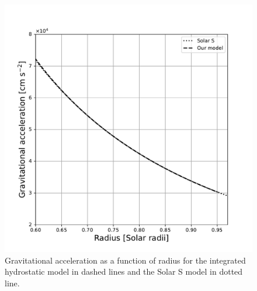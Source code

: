 \begin{figure}[htbp]
    \centering
    \includegraphics[width=0.8\linewidth]{./solar_vs_model_plots/Gravitational_acceleration.pdf} %
    \caption{Gravitational acceleration as a function of radius for the integrated hydrostatic model in dashed lines and the Solar S model in dotted line.}
    \label{fig:gravitationa_acceleration} %
\end{figure}